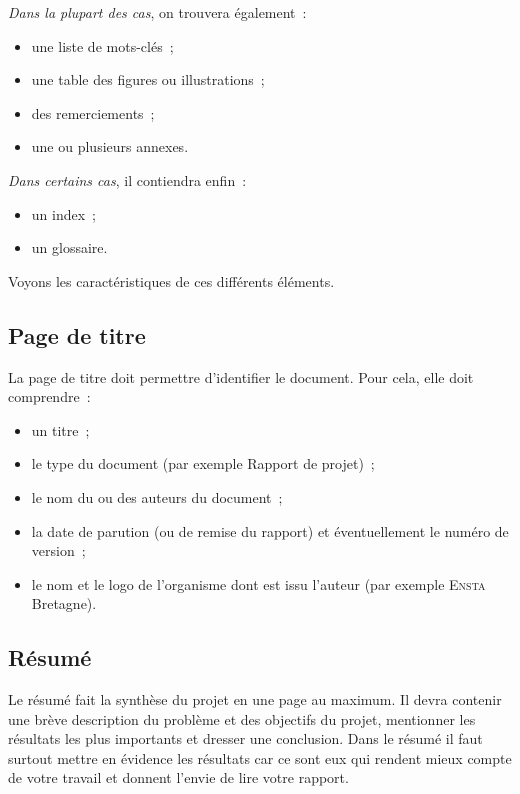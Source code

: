 
\emph{Dans la plupart des cas}, on trouvera  également~:
\begin{itemize}
\item une liste de mots-clés~;  
\item une table des figures ou illustrations~;
\item des remerciements~;
\item une ou plusieurs annexes.
\end{itemize}

\emph{Dans certains cas}, il contiendra enfin~:
\begin{itemize}
\item un index~;
\item un glossaire.
\end{itemize}

Voyons les caractéristiques de ces différents éléments.

\subsection{Page de titre}

La page de titre doit permettre d'identifier le document. Pour cela, elle doit
comprendre~: 
\begin{itemize}
\item un titre~;
\item le type du document (par exemple \og{}Rapport de projet\fg{})~;
\item le nom du ou des auteurs du document~;
\item la date de parution (ou de remise du rapport) et éventuellement le
  numéro de version~;
\item le nom et le logo de l'organisme dont est issu l'auteur (par exemple
  \textsc{Ensta} Bretagne).
\end{itemize}

\subsection{Résumé}

Le résumé fait la synthèse du projet en une page au maximum. Il
devra contenir une brève description du problème et des objectifs du projet,
mentionner les résultats les plus
importants et dresser une conclusion. Dans le résumé il faut surtout mettre en
évidence les résultats car ce sont eux qui rendent mieux compte de votre
travail et donnent l'envie de lire votre rapport. 

